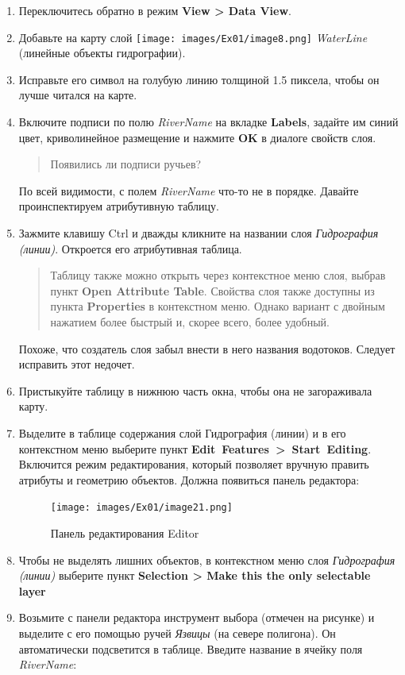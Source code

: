 \documentclass[12pt,]{book}
\begin{document}
\begin{enumerate}
\def\labelenumi{\arabic{enumi}.}
\item
  Переключитесь обратно в режим \textbf{View \textgreater{} Data View}.
\item
  Добавьте на карту слой \texttt{[image: images/Ex01/image8.png]} \emph{WaterLine} (линейные объекты гидрографии).
\item
  Исправьте его символ на голубую линию толщиной 1.5 пиксела, чтобы он лучше читался на карте.
\item
  Включите подписи по полю \emph{RiverName} на вкладке \textbf{Labels}, задайте им синий цвет, криволинейное размещение и нажмите \textbf{OK} в диалоге свойств слоя.

  \begin{quote}
  Появились ли подписи ручьев?
  \end{quote}

  По всей видимости, с полем \emph{RiverName} что-то не в порядке. Давайте проинспектируем атрибутивную таблицу.
\item
  Зажмите клавишу Ctrl и дважды кликните на названии слоя \emph{Гидрография (линии)}. Откроется его атрибутивная таблица.

  \begin{quote}
  Таблицу также можно открыть через контекстное меню слоя, выбрав пункт \textbf{Open Attribute Table}. Свойства слоя также доступны из пункта \textbf{Properties} в контекстном меню. Однако вариант с двойным нажатием более быстрый и, скорее всего, более удобный.
  \end{quote}

  Похоже, что создатель слоя забыл внести в него названия водотоков. Следует исправить этот недочет.
\item
  Пристыкуйте таблицу в нижнюю часть окна, чтобы она не загораживала карту.
\item
  Выделите в таблице содержания слой Гидрография (линии) и в его контекстном меню выберите пункт \textbf{Edit~Features~\textgreater~Start~Editing}. Включится режим редактирования, который позволяет вручную править атрибуты и геометрию объектов. Должна появиться панель редактора:

  \begin{figure}
  \centering
  \texttt{[image: images/Ex01/image21.png]}
  \caption{Панель редактирования Editor}
  \end{figure}
\item
  Чтобы не выделять лишних объектов, в контекстном меню слоя \emph{Гидрография (линии)} выберите пункт \textbf{Selection \textgreater{} Make this the only selectable layer}
\item
  Возьмите с панели редактора инструмент выбора (отмечен на рисунке) и выделите с его помощью ручей \emph{Язвицы} (на севере полигона). Он автоматически подсветится в таблице. Введите название в ячейку поля \emph{RiverName}:


\end{enumerate}
\end{document}
